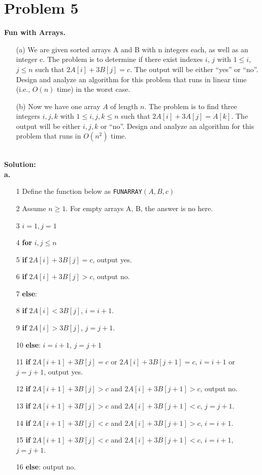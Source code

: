 \documentclass{article}
\theoremstyle{plain}
\begin{document}
\section*{Problem 5}
\textbf{Fun with Arrays.}
\begin{enumerate}
    \item[(a)] We are given sorted arrays A and B with n integers each, as well as an integer c. The problem is to determine if there exist indexes $i$, $j$ with $1 \leq i$, $j \leq n$ such that $2A[i]+3B[j] = c$. The output will be either “yes” or “no”. Design and analyze an algorithm for this problem that runs in linear time (i.e., $O(n)$ time) in the worst case.
    \item[(b)] Now we have one array $A$ of length $n$. The problem is to find three integers $i, j, k$ with $1 \leq i, j, k \leq n$ such that $2A[i] + 3A[j] = A[k]$. The output will be either $i, j, k$ or “no”. Design and analyze an algorithm for this problem that runs in $O(n^2)$ time.
\end{enumerate}
\textbf{\\Solution:\\}
\textbf{a.\\} 
\begin{enumerate}
    \item[1] Define the function below as \texttt{FUNARRAY}$(A, B, c)$
    \item[2] Assume $n \geq 1$. For empty arrays A, B, the answer is no here.
    \item[3] $i = 1, j = 1$
    \item[4] \textbf{for} $i, j \leq n$
    \item[5] \quad \quad \textbf{if} $2A[i] + 3B[j] = c$, output yes.
    \item[6] \quad \quad \textbf{if} $2A[i] + 3B[j] > c$, output no.
    \item[7] \quad \quad \textbf{else}:
    \item[8] \quad \quad \quad \quad \textbf{if} $2A[i] < 3B[j]$, $i = i + 1$.
    \item[9] \quad \quad \quad \quad \textbf{if} $2A[i] > 3B[j]$, $j = j + 1$.
    \item[10] \quad \quad \quad \quad \textbf{else}: $i = i + 1$, $j = j + 1$
    \item[11] \quad \quad \quad \quad \quad \quad \textbf{if} $2A[i+1] + 3B[j] = c$ or $2A[i] + 3B[j+1] = c$, $i = i + 1$ or $j = j + 1$, output yes.
    \item[12] \quad \quad \quad \quad \quad \quad \textbf{if} $2A[i+1] + 3B[j] > c$ and $2A[i] + 3B[j+1] > c$, output no.
    \item[13] \quad \quad \quad \quad \quad \quad \textbf{if} $2A[i+1] + 3B[j] > c$ and $2A[i] + 3B[j+1] < c$, $j = j + 1$.
    \item[14] \quad \quad \quad \quad \quad \quad \textbf{if} $2A[i+1] + 3B[j] < c$ and $2A[i] + 3B[j+1] > c$, $i = i + 1$.
    \item[15] \quad \quad \quad \quad \quad \quad \textbf{if} $2A[i+1] + 3B[j] < c$ and $2A[i] + 3B[j+1] < c$, $i = i + 1$, $j = j + 1$.
    \item[16] \textbf{else}: output no.
\end{enumerate}
\end{document}
